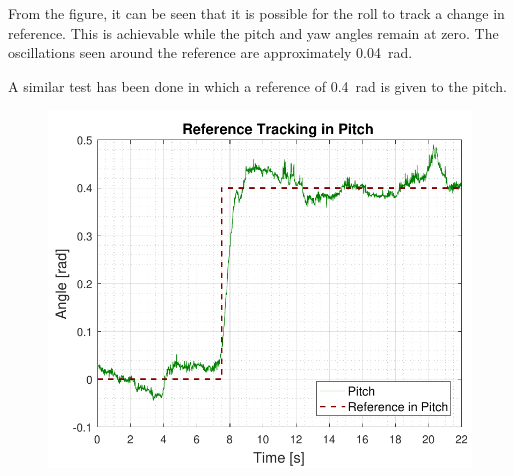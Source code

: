 \begin{minipage}{\linewidth}
\begin{minipage}{0.46\linewidth}
\begin{figure}[H]
            \centering
            \label{fig:AccepttestRefTrackRollPitchYaw}
        \end{figure}
    \end{minipage}
\end{minipage}

From the figure, it can be seen that it is possible for the roll to track a change in reference. This is achievable while the pitch and yaw angles remain at zero. The oscillations seen around the reference are approximately \SI{0.04}{rad}.

A similar test has been done in which a reference of \SI{0.4}{rad} is given to the pitch.

\begin{minipage}{\linewidth}
    \begin{minipage}{0.46\linewidth}
        \begin{figure}[H]
            \includegraphics[scale=.55]{figures/AccepttestRefTrackPitch.pdf}
            \centering			
            \label{fig:AccepttestRefTrackPitch}
        \end{figure}
    \end{minipage}
    \hspace{0.03\linewidth}
    \begin{minipage}{0.46\linewidth}

\end{minipage}
\end{minipage}
